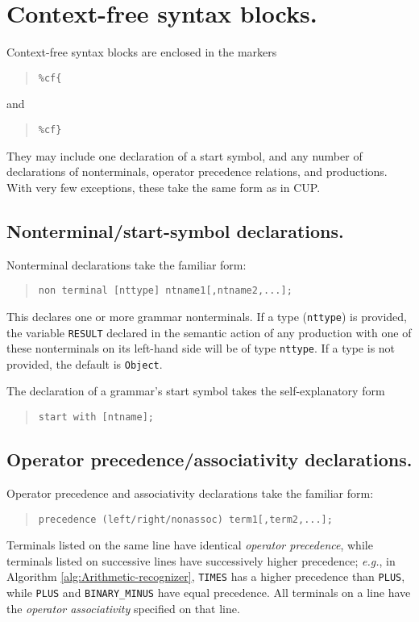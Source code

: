 \documentclass[12pt,english,twoside]{report}
\begin{document}
\section{Context-free syntax blocks.}

Context-free syntax blocks are enclosed in the markers

\begin{quote}
\texttt{\%cf\{}
\end{quote}
and

\begin{quote}
\texttt{\%cf\}}
\end{quote}
They may include one declaration of a start symbol, and any number
of declarations of nonterminals, operator precedence relations, and
productions. With very few exceptions, these take the same form as
in CUP.


\subsection{Nonterminal/start-symbol declarations.}

Nonterminal declarations take the familiar form:

\begin{quote}
\texttt{non terminal {[}nttype] ntname1{[},ntname2,...];}
\end{quote}
This declares one or more grammar nonterminals. If a type (\texttt{nttype})
is provided, the variable \texttt{RESULT} declared in the semantic
action of any production with one of these nonterminals on its left-hand
side will be of type \texttt{nttype}. If a type is not provided, the
default is \texttt{Object}.

The declaration of a grammar's start symbol takes the self-explanatory
form

\begin{quote}
\texttt{start with {[}ntname];}
\end{quote}

\subsection{Operator precedence/associativity declarations.}

Operator precedence and associativity declarations take the familiar
form:

\begin{quote}
\texttt{precedence (left/right/nonassoc) term1{[},term2,...];}
\end{quote}
Terminals listed on the same line have identical \emph{operator precedence},
while terminals listed on successive lines have successively higher
precedence; \emph{e.g.}, in Algorithm \ref{alg:Arithmetic-recognizer},
\texttt{TIMES} has a higher precedence than \texttt{PLUS}, while \texttt{PLUS}
and \texttt{BINARY\_MINUS} have equal precedence. All terminals on
a line have the \emph{operator associativity} specified on that line.
\end{document}
